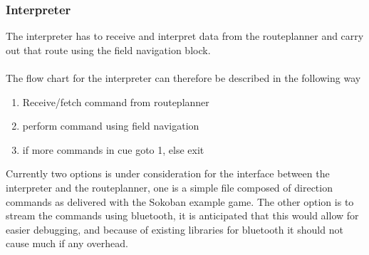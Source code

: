 \documentclass[draft, english, a4paper, 10pt]{article}
\begin{document}
		\subsubsection{Interpreter} %
		    The interpreter has to receive and interpret data from the routeplanner
		    and carry out that route using the field navigation block.\\
		    \\
		    The flow chart for the interpreter can therefore be described in the
		    following way
		    \begin{enumerate}
		    \item Receive/fetch command from routeplanner
		    \item perform command using field navigation
		    \item if more commands in cue goto 1, else exit
		    \end{enumerate}
		    Currently two options is under consideration for the interface between
		    the interpreter and the routeplanner, one is a simple file composed
		    of direction commands as delivered with the Sokoban example game.
		    The other option is to stream the commands using bluetooth, it is
		    anticipated that this would allow for easier debugging, and because
		    of existing libraries for bluetooth it should not cause much if any overhead.\\
		    \\
\end{document}
